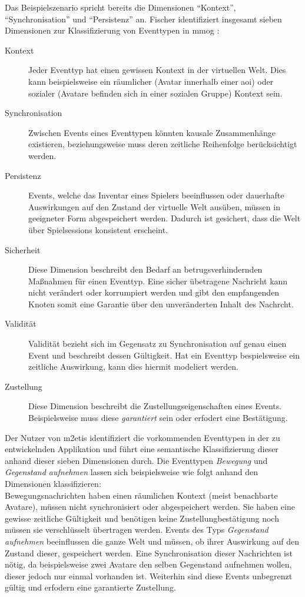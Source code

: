 Das Beispielszenario spricht bereits die Dimensionen \enquote{Kontext}, \enquote{Synchronisation} und \enquote{Persistenz} an. Fischer identifiziert insgesamt sieben Dimensionen zur Klassifizierung von Eventtypen in \ac{mmog} \cite{Fischer2010Event}:

\begin{description}
\item[Kontext] Jeder Eventtyp hat einen gewissen Kontext in der virtuellen Welt. Dies kann beispielsweise ein räumlicher (Avatar innerhalb einer \ac{aoi}) oder sozialer (Avatare befinden sich in einer sozialen Gruppe) Kontext sein.

\item[Synchronisation] Zwischen Events eines Eventtypen könnten kausale Zusammenhänge existieren, beziehungsweise muss deren zeitliche Reihenfolge berücksichtigt werden.

\item[Persistenz] Events, welche das Inventar eines Spielers beeinflussen oder dauerhafte Auswirkungen auf den Zustand der virtuelle Welt ausüben, müssen in geeigneter Form abgespeichert werden. Dadurch ist gesichert, dass die Welt über Spielsessions konsistent erscheint.

\item[Sicherheit] Diese Dimension beschreibt den Bedarf an betrugsverhindernden Maßnahmen für einen Eventtyp. Eine sicher übetragene Nachricht kann nicht verändert oder korrumpiert werden und gibt den empfangenden Knoten somit eine Garantie über den unveränderten Inhalt des Nachrcht.

\item[Validität] Validität bezieht sich im Gegensatz zu Synchronisation auf genau einen Event und beschreibt dessen Gültigkeit. Hat ein Eventtyp bespielsweise ein zeitliche Auswirkung, kann dies hiermit modeliert werden.

\item[Zustellung] Diese Dimension beschreibt die Zustellungseigenschaften eines Events. Beispielsweise muss diese \emph{garantiert} sein oder erfodert eine Bestätigung.
\end{description}

Der Nutzer von \ac{m2etis} identifiziert die vorkommenden Eventtypen in der zu entwickelnden Applikation und führt eine semantische Klassifizierung dieser anhand dieser sieben Dimensionen durch. Die Eventtypen \emph{Bewegung} und \emph{Gegenstand aufnehmen} lassen sich beispielsweise wie folgt anhand den Dimensionen klassifizieren:\\
Bewegungsnachrichten haben einen räumlichen Kontext (meist benachbarte Avatare), müssen nicht synchronisiert oder abgespeichert werden. Sie haben eine gewisse zeitliche Gültigkeit und benötigen keine Zustellungbestätigung noch müssen sie verschlüsselt übertragen werden.
Events des Typs \emph{Gegenstand aufnehmen} beeinflussen die ganze Welt und müssen, ob ihrer Auswirkung auf den Zustand dieser, gespeichert werden. Eine Synchronisation dieser Nachrichten ist nötig, da beispielsweise zwei Avatare den selben Gegenstand aufnehmen wollen, dieser jedoch nur einmal vorhanden ist. Weiterhin sind diese Events unbegrenzt gültig und erfodern eine garantierte Zustellung.
